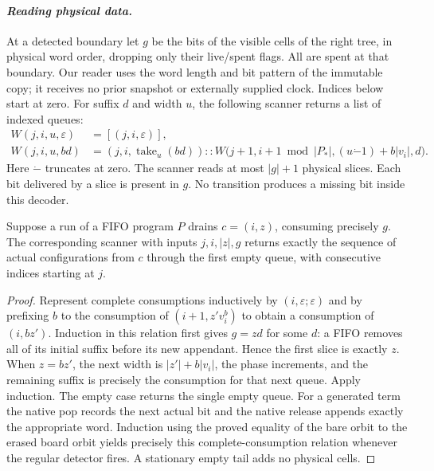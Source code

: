 \paragraph{\textit{Reading physical data.}}
At a detected boundary let \(g\) be the bits of the visible cells of the right tree, in physical word order, dropping only their live/spent flags. All are spent at that boundary. Our reader uses the word length and bit pattern of the immutable copy; it receives no prior snapshot or externally supplied clock. Indices below start at zero. For suffix \(d\) and width \(u\), the following scanner returns a list of indexed queues:
\begin{align*}
 W(j,i,u,\varepsilon)&=[(j,i,\varepsilon)],\\
 W(j,i,u,bd)&=(j,i,\operatorname{take}_{u}(bd))::
 W\bigl(j+1,i+1\bmod |P_*|,(u\mathbin{\dot-}1)+b|v_i|,d\bigr).
\end{align*}
Here \(\dot-\) truncates at zero. The scanner reads at most \(|g|+1\) physical slices. Each bit delivered by a slice is present in \(g\). No transition produces a missing bit inside this decoder.

\begin{lemma}\label{fifoexact}
Suppose a run of a FIFO program \(P\) drains \(c=(i,z)\), consuming precisely \(g\). The corresponding scanner with inputs \(j,i,|z|,g\) returns exactly the sequence of actual configurations from \(c\) through the first empty queue, with consecutive indices starting at \(j\).
\end{lemma}
\begin{proof}
Represent complete consumptions inductively by \((i,\varepsilon;\varepsilon)\) and by prefixing \(b\) to the consumption of \((i+1,z'v_i^b)\) to obtain a consumption of \((i,bz')\). Induction in this relation first gives \(g=z d\) for some \(d\): a FIFO removes all of its initial suffix before its new appendant. Hence the first slice is exactly \(z\). When \(z=bz'\), the next width is \(|z'|+b|v_i|\), the phase increments, and the remaining suffix is precisely the consumption for that next queue. Apply induction. The empty case returns the single empty queue. For a generated term the native pop records the next actual bit and the native release appends exactly the appropriate word. Induction using the proved equality of the bare orbit to the erased board orbit yields precisely this complete-consumption relation whenever the regular detector fires. A stationary empty tail adds no physical cells.
\end{proof}

